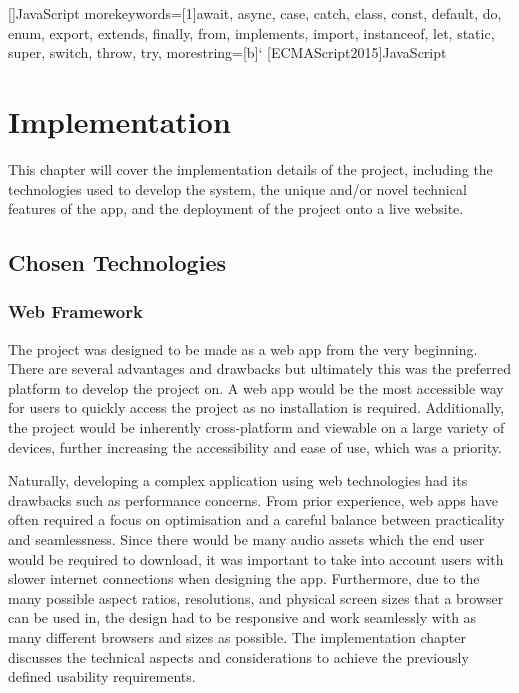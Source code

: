 []{JavaScript}{
  morekeywords=[1]{await, async, case, catch, class, const, default, do,
    enum, export, extends, finally, from, implements, import, instanceof,
    let, static, super, switch, throw, try},
  morestring=[b]` %
}
[ECMAScript2015]{JavaScript}


\chapter{Implementation}

This chapter will cover the implementation details of the project, including the technologies used to develop the system, the unique and/or novel technical features of the app, and the deployment of the project onto a live website.

\section{Chosen Technologies}

\subsection{Web Framework}
The project was designed to be made as a web app from the very beginning. There are several advantages and drawbacks but ultimately this was the preferred platform to develop the project on. A web app would be the most accessible way for users to quickly access the project as no installation is required. Additionally, the project would be inherently cross-platform and viewable on a large variety of devices, further increasing the accessibility and ease of use, which was a priority.

Naturally, developing a complex application using web technologies had its drawbacks such as performance concerns. From prior experience, web apps have often required a focus on optimisation and a careful balance between practicality and seamlessness. Since there would be many audio assets which the end user would be required to download, it was important to take into account users with slower internet connections when designing the app. Furthermore, due to the many possible aspect ratios, resolutions, and physical screen sizes that a browser can be used in, the design had to be responsive and work seamlessly with as many different browsers and sizes as possible. The implementation chapter discusses the technical aspects and considerations to achieve the previously defined usability requirements.


